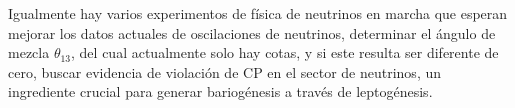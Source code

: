 \begin{ideas}


Igualmente hay varios experimentos de física de neutrinos en marcha que esperan mejorar los datos actuales de oscilaciones de neutrinos, determinar el ángulo de mezcla $\theta_{13}$, del cual actualmente solo hay cotas, y si este resulta ser diferente de cero, buscar evidencia de violación de CP en el sector de neutrinos, un ingrediente crucial para generar bariogénesis a través de leptogénesis.


\end{ideas}
